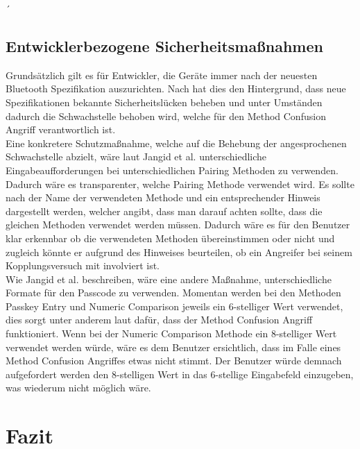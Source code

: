 ´\documentclass[
    a4paper,
    pagesize,
    pdftex,
    12pt,
]{scrartcl}
\begin{document}
\subsection{Entwicklerbezogene Sicherheitsmaßnahmen}
    Grundsätzlich gilt es für Entwickler, die Geräte immer nach der neuesten Bluetooth Spezifikation auszurichten. Nach \cite{bluetooth_newest_security_risks} hat dies den Hintergrund, dass neue Spezifikationen bekannte Sicherheitslücken beheben und unter Umständen dadurch die Schwachstelle behoben wird, welche für den Method Confusion Angriff verantwortlich ist. \\
    Eine konkretere Schutzmaßnahme, welche auf die Behebung der angesprochenen Schwachstelle abzielt, wäre laut Jangid et al. \cite{bluetooth_formal_analysis} unterschiedliche Eingabeaufforderungen bei unterschiedlichen Pairing Methoden zu verwenden. Dadurch wäre es transparenter, welche Pairing Methode verwendet wird. Es sollte nach \cite{bluetooth_formal_analysis}  der Name der verwendeten Methode und ein entsprechender Hinweis dargestellt werden, welcher angibt, dass man darauf achten sollte, dass die gleichen Methoden verwendet werden müssen. Dadurch wäre es für den Benutzer klar erkennbar ob die verwendeten Methoden übereinstimmen oder nicht und zugleich könnte er aufgrund des Hinweises beurteilen, ob ein Angreifer bei seinem Kopplungsversuch mit involviert ist. \\
    Wie Jangid et al. \cite{bluetooth_formal_analysis} beschreiben, wäre eine andere Maßnahme, unterschiedliche Formate für den Passcode zu verwenden. Momentan werden bei den Methoden Passkey Entry und Numeric Comparison jeweils ein 6-stelliger Wert verwendet, dies sorgt unter anderem laut \cite{bluetooth_formal_analysis} dafür, dass der Method Confusion Angriff funktioniert. Wenn bei der Numeric Comparison Methode ein 8-stelliger Wert verwendet werden würde, wäre es dem Benutzer ersichtlich, dass im Falle eines Method Confusion Angriffes etwas nicht stimmt. Der Benutzer würde demnach aufgefordert werden den 8-stelligen Wert in das 6-stellige Eingabefeld einzugeben, was wiederum nicht möglich wäre.
    
    \newpage
\section{Fazit}

    \newpage

    
    
\end{document}
